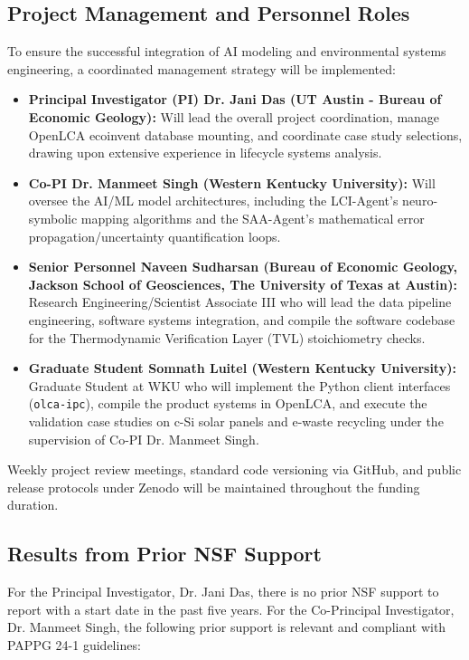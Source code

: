 \documentclass[11pt]{article}
\begin{document}
\subsection{Project Management and Personnel Roles}
To ensure the successful integration of AI modeling and environmental systems engineering, a coordinated management strategy will be implemented:
\begin{itemize}
    \item \textbf{Principal Investigator (PI) Dr. Jani Das (UT Austin - Bureau of Economic Geology):} Will lead the overall project coordination, manage OpenLCA ecoinvent database mounting, and coordinate case study selections, drawing upon extensive experience in lifecycle systems analysis.
    \item \textbf{Co-PI Dr. Manmeet Singh (Western Kentucky University):} Will oversee the AI/ML model architectures, including the LCI-Agent's neuro-symbolic mapping algorithms and the SAA-Agent's mathematical error propagation/uncertainty quantification loops.
    \item \textbf{Senior Personnel Naveen Sudharsan (Bureau of Economic Geology, Jackson School of Geosciences, The University of Texas at Austin):} Research Engineering/Scientist Associate III who will lead the data pipeline engineering, software systems integration, and compile the software codebase for the Thermodynamic Verification Layer (TVL) stoichiometry checks.
    \item \textbf{Graduate Student Somnath Luitel (Western Kentucky University):} Graduate Student at WKU who will implement the Python client interfaces (\texttt{olca-ipc}), compile the product systems in OpenLCA, and execute the validation case studies on c-Si solar panels and e-waste recycling under the supervision of Co-PI Dr. Manmeet Singh.
\end{itemize}
Weekly project review meetings, standard code versioning via GitHub, and public release protocols under Zenodo will be maintained throughout the funding duration.

\subsection{Results from Prior NSF Support}
For the Principal Investigator, Dr. Jani Das, there is no prior NSF support to report with a start date in the past five years. For the Co-Principal Investigator, Dr. Manmeet Singh, the following prior support is relevant and compliant with PAPPG 24-1 guidelines:
\end{document}
